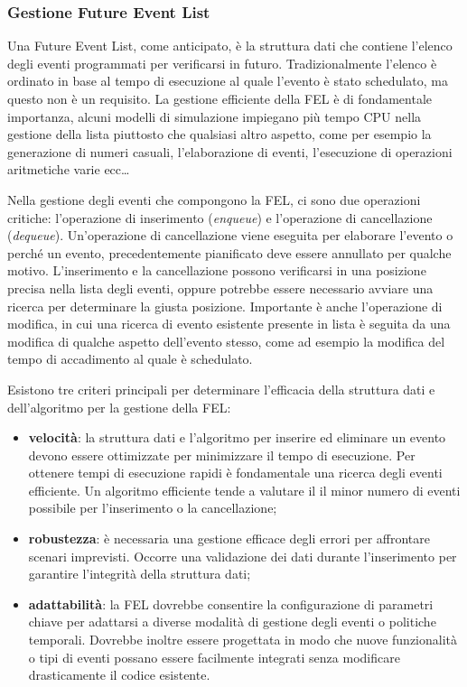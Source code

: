 \documentclass[12pt,a4paper,openright,twoside]{book}
\begin{document}
\subsubsection{Gestione Future Event List}
Una Future Event List, come anticipato, è la struttura dati che contiene l'elenco degli eventi programmati per verificarsi in futuro. Tradizionalmente l'elenco è ordinato in base al tempo di esecuzione al quale l'evento è stato schedulato, ma questo non è un requisito. 
La gestione efficiente della FEL è di fondamentale importanza, alcuni modelli di simulazione impiegano più tempo CPU nella gestione della lista piuttosto che qualsiasi altro aspetto, come per esempio la generazione di numeri casuali, l'elaborazione di eventi, l'esecuzione di operazioni aritmetiche varie ecc\dots

Nella gestione degli eventi che compongono la FEL, ci sono due operazioni critiche: l'operazione di inserimento (\textit{enqueue}) e l'operazione di cancellazione (\textit{dequeue}). Un'operazione di cancellazione viene eseguita per elaborare l'evento o perché un evento, precedentemente pianificato deve essere annullato per qualche motivo. L'inserimento e la cancellazione possono verificarsi in una posizione precisa nella lista degli eventi, oppure potrebbe essere necessario avviare una ricerca per determinare la giusta posizione. 
Importante è anche l'operazione di modifica, in cui una ricerca di evento esistente presente in lista è seguita da una modifica di qualche aspetto dell'evento stesso, come ad esempio la modifica del tempo di accadimento al quale è schedulato. 

Esistono tre criteri principali per determinare l'efficacia della struttura dati e dell'algoritmo per la gestione della FEL: 
\begin{itemize}
    \item \textbf{velocità}: la struttura dati e l'algoritmo per inserire ed eliminare un evento devono essere ottimizzate per minimizzare il tempo di esecuzione. Per ottenere tempi di esecuzione rapidi è fondamentale una ricerca degli eventi efficiente. Un algoritmo efficiente tende a valutare il  il minor numero di eventi possibile per l'inserimento o la cancellazione;
    \item  \textbf{robustezza}: è necessaria una gestione efficace degli errori per affrontare scenari imprevisti. Occorre una validazione dei dati durante l'inserimento per garantire l'integrità della struttura dati; 
    \item \textbf{adattabilità}: la FEL dovrebbe consentire la configurazione di parametri chiave per adattarsi a diverse modalità di gestione degli eventi o politiche temporali. Dovrebbe inoltre essere progettata in modo che nuove funzionalità o tipi di eventi possano essere facilmente integrati senza modificare drasticamente il codice esistente. 
\end{itemize}
\end{document}
